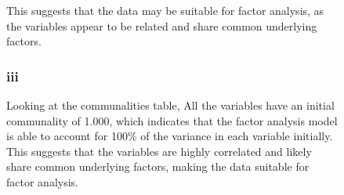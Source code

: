 \documentclass[english,10pt,a4paper]{article}
\begin{document}
\begin{figure}
This suggests that the data may be suitable for factor analysis, as the variables appear to be related and share common underlying factors.

\subsubsection*{iii}
Looking at the communalities table, All the variables have an initial communality of 1.000, which indicates that the factor analysis model is able to account for 100\% of the variance in each variable initially.
This suggests that the variables are highly correlated and likely share common underlying factors, making the data suitable for factor analysis.
		

\end{figure}
\end{document}

